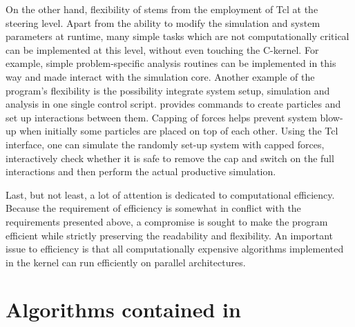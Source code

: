 On the other hand, flexibility of \es stems from the employment of Tcl at
the steering level. Apart from the ability to modify the simulation and
system parameters at runtime, many simple tasks which are not computationally
critical can be implemented at this level, without even touching the C-kernel.
For example, simple problem-specific analysis routines can be implemented
in this way and made interact with the simulation core.
Another example of the program's flexibility is the possibility  integrate
system setup, simulation and analysis in one single control script. \es
provides commands to create particles and set up interactions between them. 
Capping of forces helps prevent system blow-up when initially some particles
are placed on top of each other. Using the Tcl interface, one can simulate
the randomly set-up system with capped forces, interactively check whether
it is safe to remove the cap and switch on the full interactions and then 
perform the actual productive simulation.

Last, but not least, a lot of attention is dedicated to computational
efficiency. Because the requirement of efficiency is somewhat in conflict
with the requirements presented above, a compromise is sought to make the
program efficient while strictly preserving the readability and flexibility.
An important issue to efficiency is that all computationally expensive algorithms
implemented in the kernel can run efficiently on parallel architectures.

%

\section{Algorithms contained in \es}

